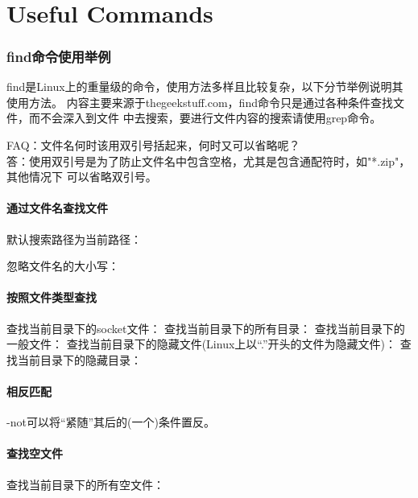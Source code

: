 \documentclass[a4paper,11pt]{article}
\begin{document}
  \tt %
  \pagestyle{header}
  \sybmaketitle
  \tableofcontents
  \newpage

  \pagestyle{main}
  \setcounter{page}{1}

  \part[Useful Commands]{Useful Commands}
  \section[find命令使用举例]{find命令使用举例}
  find是Linux上的重量级的命令，使用方法多样且比较复杂，以下分节举例说明其使用方法。
  内容主要来源于thegeekstuff.com，find命令只是通过各种条件查找文件，而不会深入到文件
  中去搜索，要进行文件内容的搜索请使用grep命令。\par
  \bigskip
  FAQ：文件名何时该用双引号括起来，何时又可以省略呢？\\
  答：使用双引号是为了防止文件名中包含空格，尤其是包含通配符时，如"*.zip"，其他情况下
  可以省略双引号。

  \subsection[通过文件名查找文件]{通过文件名查找文件}
  默认搜索路径为当前路径：

  忽略文件名的大小写：

  \subsection[按照文件类型查找]{按照文件类型查找}
  查找当前目录下的socket文件：
  查找当前目录下的所有目录：
  查找当前目录下的一般文件：
  查找当前目录下的隐藏文件(Linux上以“.”开头的文件为隐藏文件)：
  查找当前目录下的隐藏目录：

  \subsection[相反匹配]{相反匹配}
  -not可以将“紧随”其后的(一个)条件置反。

  \subsection[查找空文件]{查找空文件}
  查找当前目录下的所有空文件：
\end{document}
